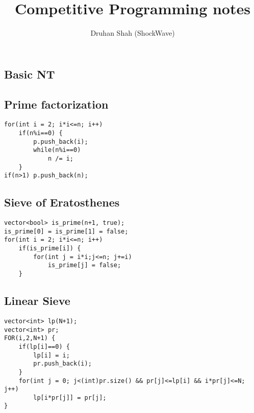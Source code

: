 \documentclass{article}
\author{Druhan Shah (ShockWave)}
\title{Competitive Programming notes}
\begin{document}
    \maketitle
    \tableofcontents
    \begin{multicols*}{2}

	
    \section{Basic NT}
        \subsection{Prime factorization}

        \begin{lstlisting}
for(int i = 2; i*i<=n; i++)
    if(n%i==0) {
        p.push_back(i);
        while(n%i==0)
            n /= i;
    }
if(n>1) p.push_back(n);   \end{lstlisting}


        \subsection{Sieve of Eratosthenes}

        \begin{lstlisting}
vector<bool> is_prime(n+1, true);
is_prime[0] = is_prime[1] = false;
for(int i = 2; i*i<=n; i++)
    if(is_prime[i]) {
        for(int j = i*i;j<=n; j+=i)
            is_prime[j] = false;
    }   \end{lstlisting}

        \subsection{Linear Sieve}
        

        \begin{lstlisting}
vector<int> lp(N+1);
vector<int> pr;
FOR(i,2,N+1) {
    if(lp[i]==0) {
        lp[i] = i;
        pr.push_back(i);
    }
    for(int j = 0; j<(int)pr.size() && pr[j]<=lp[i] && i*pr[j]<=N; j++)
        lp[i*pr[j]] = pr[j];
}       \end{lstlisting}


\end{multicols*}
\end{document}
